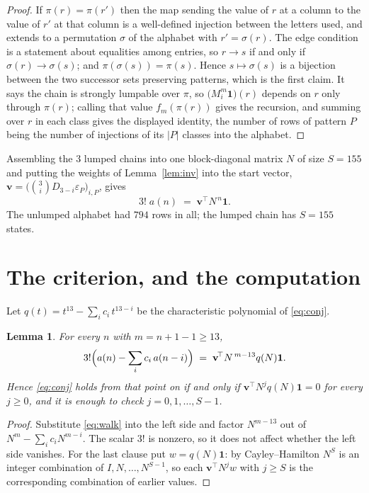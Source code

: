 \documentclass[11pt,a4paper]{article}
\theoremstyle{plain}
\newtheorem{lemma}[theorem]{Lemma}
\theoremstyle{definition}
\begin{document}
\begin{proof}
If $\pi(r)=\pi(r')$ then the map sending the value of $r$ at a column to the value of $r'$
at that column is a well-defined injection between the letters used, and extends to a
permutation $\sigma$ of the alphabet with $r'=\sigma(r)$. The edge condition is a statement
about equalities among entries, so $r\to s$ if and only if $\sigma(r)\to\sigma(s)$; and
$\pi(\sigma(s))=\pi(s)$. Hence $s\mapsto\sigma(s)$ is a bijection between the two successor
sets preserving patterns, which is the first claim. It says the chain is strongly lumpable
over $\pi$, so $\bigl(M_i^{m}\mathbf{1}\bigr)(r)$ depends on $r$ only through $\pi(r)$;
calling that value $f_m(\pi(r))$ gives the recursion, and summing over $r$ in each class
gives the displayed identity, the number of rows of pattern $P$ being the number of
injections of its $|P|$ classes into the alphabet.
\end{proof}

Assembling the $3$ lumped chains into one block-diagonal matrix $N$ of size $S=155$ and
putting the weights of Lemma~\ref{lem:inv} into the start vector,
$\mathbf{v}=\bigl(\binom{3}{i}D_{3-i}\varepsilon_P\bigr)_{i,P}$, gives
\begin{equation}\label{eq:walk}
3!\;a(n)\;=\;\mathbf{v}^{\!\top}N^{\,n}\mathbf{1} .
\end{equation}
The unlumped alphabet had $794$ rows in all; the lumped chain has $S=155$ states.

\section{The criterion, and the computation}

Let $q(t)=t^{13}-\sum_i c_i\,t^{13-i}$ be the characteristic polynomial of
\eqref{eq:conj}.

\begin{lemma}\label{lem:crit}
For every $n$ with $m=n+1-1\ge13$,
\[
3!\Bigl(a(n)-\sum_i c_i\,a(n-i)\Bigr)\;=\;\mathbf{v}^{\!\top}N^{\,m-13}q(N)\mathbf{1} .
\]
Hence \eqref{eq:conj} holds from that point on if and only if
$\mathbf{v}^{\!\top}N^{j}q(N)\mathbf{1}=0$ for every $j\ge0$, and it is enough to check
$j=0,1,\dots,S-1$.
\end{lemma}

\begin{proof}
Substitute \eqref{eq:walk} into the left side and factor $N^{m-13}$ out of
$N^{m}-\sum_i c_iN^{m-i}$. The scalar $3!$ is nonzero, so it does not affect whether
the left side vanishes. For the last clause put $w=q(N)\mathbf{1}$: by Cayley--Hamilton
$N^{S}$ is an integer combination of $I,N,\dots,N^{S-1}$, so each
$\mathbf{v}^{\!\top}N^{j}w$ with $j\ge S$ is the corresponding combination of earlier
values.
\end{proof}
\end{document}
